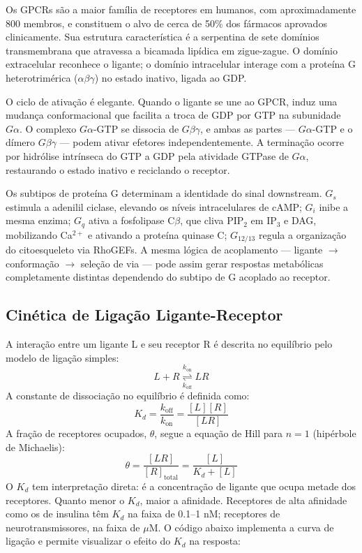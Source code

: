 Os GPCRs são a maior família de receptores em humanos, com aproximadamente 800
membros, e constituem o alvo de cerca de 50\% dos fármacos aprovados clinicamente.
Sua estrutura característica é a serpentina de sete domínios transmembrana que
atravessa a bicamada lipídica em zigue-zague. O domínio extracelular reconhece
o ligante; o domínio intracelular interage com a proteína G heterotrimérica
($\alpha\beta\gamma$) no estado inativo, ligada ao GDP.

O ciclo de ativação é elegante. Quando o ligante se une ao GPCR, induz uma
mudança conformacional que facilita a troca de GDP por GTP na subunidade
$G\alpha$. O complexo $G\alpha$-GTP se dissocia de $G\beta\gamma$, e ambas as
partes --- $G\alpha$-GTP e o dímero $G\beta\gamma$ --- podem ativar efetores
independentemente. A terminação ocorre por hidrólise intrínseca do GTP a GDP
pela atividade GTPase de $G\alpha$, restaurando o estado inativo e reciclando o
receptor.

Os subtipos de proteína G determinam a identidade do sinal downstream. $G_s$
estimula a adenilil ciclase, elevando os níveis intracelulares de cAMP; $G_i$
inibe a mesma enzima; $G_q$ ativa a fosfolipase C$\beta$, que cliva PIP$_2$ em
IP$_3$ e DAG, mobilizando Ca$^{2+}$ e ativando a proteína quinase C; $G_{12/13}$
regula a organização do citoesqueleto via RhoGEFs. A mesma lógica de acoplamento
--- ligante $\to$ conformação $\to$ seleção de via --- pode assim gerar respostas
metabólicas completamente distintas dependendo do subtipo de G acoplado ao receptor.

\subsection{Cinética de Ligação Ligante-Receptor}
\label{subsec:09-cinetica}

A interação entre um ligante L e seu receptor R é descrita no equilíbrio pelo
modelo de ligação simples:
\begin{equation}
L + R \underset{k_{\mathrm{off}}}{\overset{k_{\mathrm{on}}}{\rightleftharpoons}} LR
\end{equation}
A constante de dissociação no equilíbrio é definida como:
\begin{equation}
K_d = \frac{k_{\mathrm{off}}}{k_{\mathrm{on}}} = \frac{[L][R]}{[LR]}
\end{equation}
A fração de receptores ocupados, $\theta$, segue a equação de Hill para $n = 1$
(hipérbole de Michaelis):
\begin{equation}
\theta = \frac{[LR]}{[R]_{\mathrm{total}}} = \frac{[L]}{K_d + [L]}
\end{equation}
O $K_d$ tem interpretação direta: é a concentração de ligante que ocupa metade
dos receptores. Quanto menor o $K_d$, maior a afinidade. Receptores de alta
afinidade como os de insulina têm $K_d$ na faixa de 0.1--1 nM; receptores de
neuro\-transmissores, na faixa de $\mu$M. O código abaixo implementa a curva de
ligação e permite visualizar o efeito do $K_d$ na resposta:

